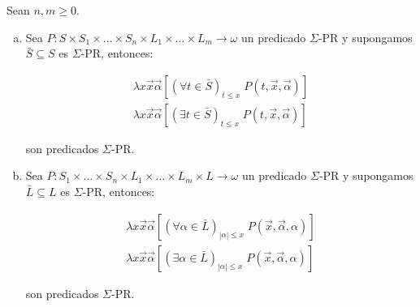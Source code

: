   \begin{lemma}
    \par Sean $n, m \geq 0$.

    \begin{enumerate}[a)]
      \item Sea $P: S \times S_{1} \times \dotsc \times S_{n} \times L_{1} \times \dotsc \times L_{m} \rightarrow
        \omega$ un predicado $\Sigma$-PR y supongamos $\bar{S} \subseteq S$ es $\Sigma$-PR, entonces:

        \begin{eqnarray}
          \nonumber \lambda x\vec{x}\vec{\alpha} \left[(\forall t \in \bar{S})_{t\leq x} \; P(t,\vec{x},\vec{\alpha})
            \right] \\
          \nonumber \lambda x\vec{x}\vec{\alpha} \left[(\exists t \in \bar{S})_{t\leq x} \; P(t,\vec{x},\vec{\alpha})
            \right]
        \end{eqnarray}

        \par son predicados $\Sigma$-PR.

      \item Sea $P: S_{1} \times \dotsc \times S_{n} \times L_{1} \times \dotsc \times L_{m} \times L \rightarrow
        \omega$ un predicado $\Sigma$-PR y supongamos $\bar{L} \subseteq L$ es $\Sigma$-PR, entonces:

        \begin{eqnarray}
          \nonumber \lambda x\vec{x}\vec{\alpha} \left[(\forall \alpha \in \bar{L})_{\left\vert \alpha \right\vert
            \leq x} \; P(\vec{x},\vec{\alpha},\alpha)\right] \\
          \nonumber \lambda x\vec{x}\vec{\alpha} \left[(\exists \alpha \in \bar{L})_{\left\vert \alpha \right\vert
            \leq x} \; P(\vec{x},\vec{\alpha},\alpha)\right]
        \end{eqnarray}

        \par son predicados $\Sigma$-PR.
    \end{enumerate}
  \end{lemma}
